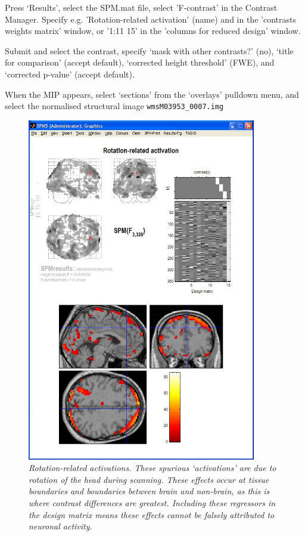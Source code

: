 \bi
\item{Press `Results', select the SPM.mat file, select 'F-contrast' in the Contrast Manager. Specify e.g. 'Rotation-related activation' (name) and in the 'contrasts weights matrix' window, or '1:11 15' in the 'columns for reduced design' window.} 
\item{Submit and select the contrast, specify `mask with other contrasts?' (no), `title for comparison' (accept default), `corrected height threshold' (FWE), and `corrected p-value' (accept default).}
\item{When the MIP appears, select `sections' from the `overlays' pulldown menu, and select the normalised structural image \verb!wmsM03953_0007.img!}
\ei

\begin{figure}
\begin{center}
\includegraphics[width=100mm]{faces/rotations}
\caption{\em Rotation-related activations. These spurious `activations' are due to rotation of the head during scanning. These effects occur at tissue boundaries and boundaries between brain and non-brain, as this is where contrast differences are greatest. Including these regressors in the design matrix means these effects cannot be falsely attributed to neuronal activity. \label{rotations} }
\end{center}
\end{figure}

